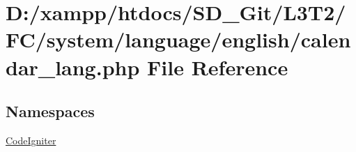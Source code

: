 \hypertarget{system_2language_2english_2calendar__lang_8php}{}\section{D\+:/xampp/htdocs/\+S\+D\+\_\+\+Git/\+L3\+T2/\+F\+C/system/language/english/calendar\+\_\+lang.php File Reference}
\label{system_2language_2english_2calendar__lang_8php}
\subsection*{Namespaces}
\begin{DoxyCompactItemize}
\item 
 \hyperlink{namespace_code_igniter}{Code\+Igniter}
\end{DoxyCompactItemize}
